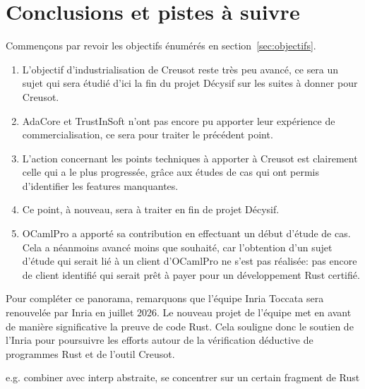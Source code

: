 \documentclass[a4paper,11pt]{article}
\begin{document}
\section{Conclusions et pistes à suivre}
\label{sec:conclusion}

Commençons par revoir les objectifs énumérés en section~\ref{sec:objectifs}.
\begin{enumerate}
\item L'objectif d'industrialisation de Creusot reste très peu avancé, ce sera
  un sujet qui sera étudié d'ici la fin du projet Décysif sur les suites à
  donner pour Creusot.
\item AdaCore et TrustInSoft n'ont pas encore pu apporter leur expérience de commercialisation, ce sera pour traiter le précédent point.
\item L'action concernant les points techniques à apporter à Creusot est
  clairement celle qui a le plus progressée, grâce aux études de cas qui ont
  permis d'identifier les features manquantes.
\item Ce point, à nouveau, sera à traiter en fin de projet Décysif.
\item OCamlPro a apporté sa contribution en effectuant un début d'étude de
  cas. Cela a néanmoins avancé moins que souhaité, car l'obtention d'un sujet
  d'étude qui serait lié à un client d'OCamlPro ne s'est pas réalisée: pas
  encore de client identifié qui serait prêt à payer pour un développement Rust
  certifié.
\end{enumerate}

Pour compléter ce panorama, remarquons que l'équipe Inria Toccata sera
renouvelée par Inria en juillet 2026. Le nouveau projet de l'équipe met en avant
de manière significative la preuve de code Rust. Cela souligne donc le soutien
de l'Inria pour poursuivre les efforts autour de la vérification déductive de
programmes Rust et de l'outil Creusot.

e.g. combiner avec interp abstraite, se concentrer sur un certain fragment de Rust


%

\end{document}
